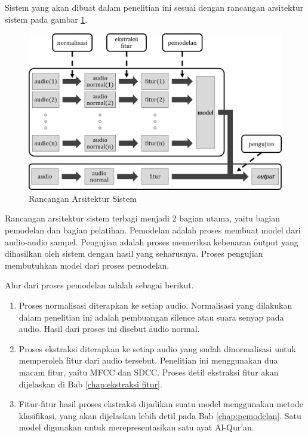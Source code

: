 Sistem yang akan dibuat dalam penelitian ini sesuai dengan rancangan arsitektur sistem pada gambar \ref{fig:arsitektur_sistem}.
\begin{figure}
  \centering
  \includegraphics[width=\linewidth]{pics/arsitektur_sistemc}
  \caption{Rancangan Arsitektur Sistem}
  \label{fig:arsitektur_sistem}
\end{figure}

Rancangan arsitektur sistem terbagi menjadi 2 bagian utama, yaitu bagian pemodelan dan bagian pelatihan. Pemodelan adalah proses membuat model dari audio-audio sampel. Pengujian adalah proses memeriksa kebenaran \f{output} yang dihasilkan oleh sistem dengan hasil yang seharusnya. Proses pengujian membutuhkan model dari proses pemodelan.

Alur dari proses pemodelan adalah sebagai berikut.
\begin{enumerate}
  \item Proses normalisasi diterapkan ke setiap audio. Normalisasi yang dilakukan dalam penelitian ini adalah pembuangan \f{silence} atau suara senyap pada audio. Hasil dari proses ini disebut \f{audio normal}.
  \item Proses ekstraksi diterapkan ke setiap audio yang sudah dinormalisasi untuk memperoleh \f{fitur} dari audio tersebut. Penelitian ini menggunakan dua macam fitur, yaitu MFCC dan SDCC. Proses detil ekstraksi fitur akan dijelaskan di Bab \ref{chap:ekstraksi fitur}.
  \item Fitur-fitur hasil proses ekstraksi dijadikan suatu model menggunakan metode klasifikasi, yang akan dijelaskan lebih detil pada Bab \ref{chap:pemodelan}. Satu model digunakan untuk merepresentasikan satu ayat Al-Qur'an.
\end{enumerate}

